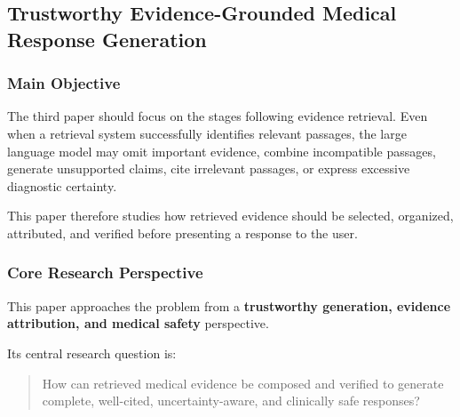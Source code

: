 \documentclass{article}
\begin{document}
\subsection{Trustworthy Evidence-Grounded Medical Response Generation}





\subsubsection{Main Objective}

The third paper should focus on the stages following evidence retrieval. Even when a retrieval system successfully identifies relevant passages, the large language model may omit important evidence, combine incompatible passages, generate unsupported claims, cite irrelevant passages, or express excessive diagnostic certainty.

This paper therefore studies how retrieved evidence should be selected, organized, attributed, and verified before presenting a response to the user.

\subsubsection{Core Research Perspective}

This paper approaches the problem from a \textbf{trustworthy generation, evidence attribution, and medical safety} perspective.

Its central research question is:
\begin{quote}
How can retrieved medical evidence be composed and verified to generate
complete, well-cited, uncertainty-aware, and clinically safe responses?
\end{quote}
\end{document}
